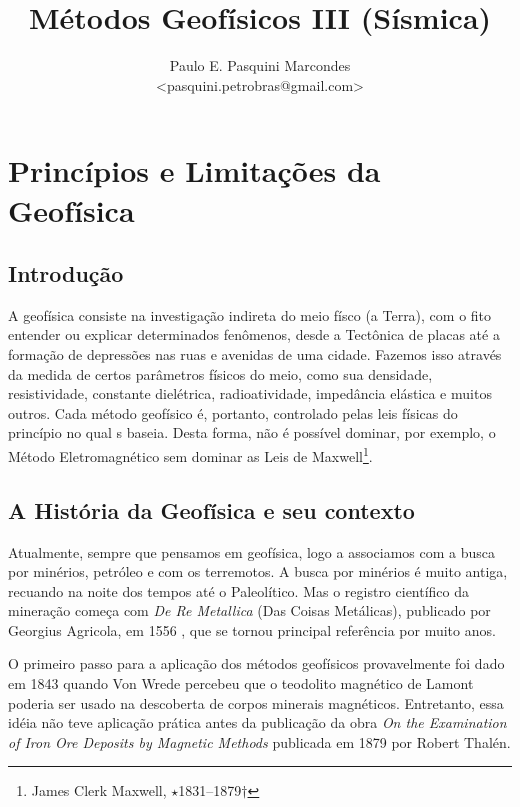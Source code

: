 \documentclass[a4paper,11pt]{scrbook}
\title{M\'etodos Geof\'isicos III (S\'ismica)}
\author{Paulo E. Pasquini Marcondes \\<pasquini.petrobras@gmail.com>}
\begin{document}
\maketitle


\chapter{Princ\'ipios e Limita\c{c}\~oes da Geof\'isica}

	\section{Introdu\c{c}\~ao}
A geof\'isica consiste na investiga\c{c}\~ao indireta do meio f\'isco (a Terra), com o fito entender ou explicar determinados fen\^omenos, desde a Tect\^onica de placas at\'e a forma\c{c}\~ao de depress\~oes nas ruas e avenidas de uma cidade.
Fazemos isso atrav\'es da medida de certos par\^ametros f\'isicos do meio, como sua densidade, resistividade, constante diel\'etrica, radioatividade, imped\^ancia el\'astica e muitos outros.
Cada m\'etodo geof\'isico \'e, portanto, controlado pelas leis f\'isicas do princ\'ipio no qual s baseia. Desta forma, n\~ao \'e poss\'ivel dominar, por exemplo, o M\'etodo Eletromagn\'etico sem dominar as Leis de Maxwell\footnote{James Clerk Maxwell, $\star$1831--1879$\dagger$}.

	\section{A Hist\'oria da Geof\'isica e seu contexto}
Atualmente, sempre que pensamos em geof\'isica, logo a associamos com a busca por min\'erios, petr\'oleo e com os terremotos.
A busca por min\'erios \'e muito antiga, recuando na noite dos tempos at\'e o Paleol\'itico.
Mas o registro cient\'ifico da minera\c{c}\~ao come\c{c}a com \emph{De Re Metallica} (Das Coisas Met\'alicas), publicado por Georgius Agricola, em 1556 \citep{telford_applied_1990}, que se tornou principal refer\^encia por muito anos.

O primeiro passo para a aplica\c{c}\~ao dos m\'etodos geof\'isicos provavelmente foi dado em 1843 quando Von Wrede percebeu que o teodolito magn\'etico de Lamont poderia ser usado na descoberta de corpos minerais magn\'eticos.
Entretanto, essa id\'eia n\~ao teve aplica\c{c}\~ao pr\'atica antes da publica\c{c}\~ao da obra \emph{On the Examination of Iron Ore Deposits by Magnetic Methods} publicada em 1879 por Robert Thal\'en.
\end{document}
